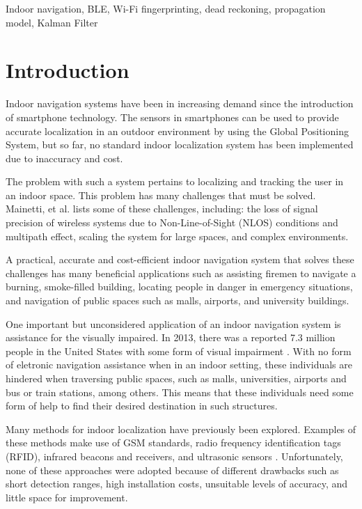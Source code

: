 \documentclass[conference]{IEEEtran}
\begin{document}
\begin{IEEEkeywords}
Indoor navigation, BLE, Wi-Fi fingerprinting, dead reckoning, propagation model, Kalman Filter
\end{IEEEkeywords}

\section{Introduction}
Indoor navigation systems have been in increasing demand since the introduction of smartphone technology. The sensors in smartphones can be used to provide accurate localization in an outdoor environment by using the Global Positioning System, but so far, no standard indoor localization system has been implemented due to inaccuracy and cost.

The problem with such a system pertains to localizing and tracking the user in an indoor space. This problem has many challenges that must be solved. Mainetti, et al. \cite{mainetti2014survey} lists some of these challenges, including: the loss of signal precision of wireless systems due to Non-Line-of-Sight (NLOS) conditions and multipath effect, scaling the system for large spaces, and complex environments.

A practical, accurate and cost-efficient indoor navigation system that solves these challenges has many beneficial applications such as assisting firemen to navigate a burning, smoke-filled building, locating people in danger in emergency situations, and navigation of public spaces such as malls, airports, and university buildings.

One important but unconsidered application of an indoor navigation system is assistance for the visually impaired. In 2013, there was a reported 7.3 million people in the United States with some form of visual impairment \cite{NFB}. With no form of eletronic navigation assistance when in an indoor setting, these individuals are hindered when traversing public spaces, such as malls, universities, airports and bus or train stations, among others. This means that these individuals need some form of help to find their desired destination in such structures.

Many methods for indoor localization have previously been explored. Examples of these methods make use of GSM standards, radio frequency identification tags (RFID), infrared beacons and receivers, and ultrasonic sensors \cite{otsason2005accurate,li2011performance,liu2014survey,ward1997new,medina2013ultrasound}. Unfortunately, none of these approaches were adopted because of different drawbacks such as short detection ranges, high installation costs, unsuitable levels of accuracy, and little space for improvement.
\end{document}
